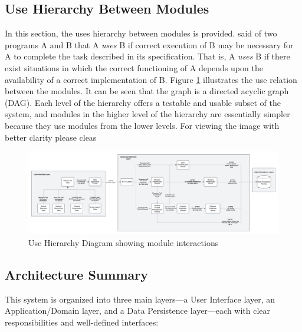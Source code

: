 \documentclass[12pt, titlepage]{article}
\begin{document}
\begin{landscape}
\section{Use Hierarchy Between Modules} \label{SecUse}
In this section, the uses hierarchy between modules is
provided. \citet{Parnas1978} said of two programs A and B that A {\em uses} B if
correct execution of B may be necessary for A to complete the task described in
its specification. That is, A {\em uses} B if there exist situations in which
the correct functioning of A depends upon the availability of a correct
implementation of B.  Figure \ref{FigUH} illustrates the use relation between
the modules. It can be seen that the graph is a directed acyclic graph
(DAG). Each level of the hierarchy offers a testable and usable subset of the
system, and modules in the higher level of the hierarchy are essentially simpler
because they use modules from the lower levels. For viewing the image with better clarity please cleas
\begin{figure}[H]
\centering
\includegraphics[width=1.45\textwidth]{../../assets/ContextDesignFlow.png}
\caption{Use Hierarchy Diagram showing module interactions}
\label{FigUH}
\end{figure}
\end{landscape}
\subsection{Architecture Summary}
\noindent This system is organized into three main layers---a User Interface layer, an Application/Domain layer, and a Data Persistence layer---each with clear responsibilities and well-defined interfaces:
\end{document}

